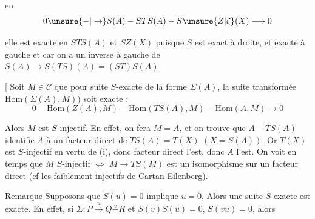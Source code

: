 en
\[
0\unsure{-|\to}S(A)-STS(A)-S\unsure{Z|\zeta}(X)\longrightarrow0
\]

elle est exacte en $STS(A)$ et $SZ(X)$ puisque $S$ est exact à droite, et exacte à gauche et  car on a  un inverse à  gauche de $S(A)\to S(TS)(A)=(ST)S(A)$.

[ Soit $M\in\mathcal C$  que pour  suite  $S$-exacte de la forme $\Sigma(A)$, la suite transformée $\mathrm{Hom}(\Sigma(A),M))$ soit exacte :
\[
0-\mathrm{Hom}(Z(A),M)-\mathrm{Hom}(TS(A),M)-\mathrm{Hom}(A,M)\to0
\]

Alors $M$ est $S$-injectif. En effet, on fera $M=A$, et on trouve que $A-TS(A)$ identifie $A$ à un \uline{facteur direct} de $TS(A)=T(X)$ $(X=S(A))$. Or $T(X)$ est $S$-injectif en vertu de (i), donc  facteur direct l'est, donc $A$ l'est. On voit en \unsure{$=$} temps que $M$ $S$-injectif $\Longleftrightarrow$ $M\to TS(M)$ est un isomorphisme sur un facteur direct (cf les faiblement injectifs de Cartan Eilenberg).

\uline{Remarque} Supposons    que $S(u)=0$ implique $u=0$,  Alors une suite $S$-exacte  est exacte. En effet,   si $\Sigma:P\xrightarrow{u}Q\overset{v}{-}R$ et $S(v)S(u)=0$,   $S(vu)=0$, alors

